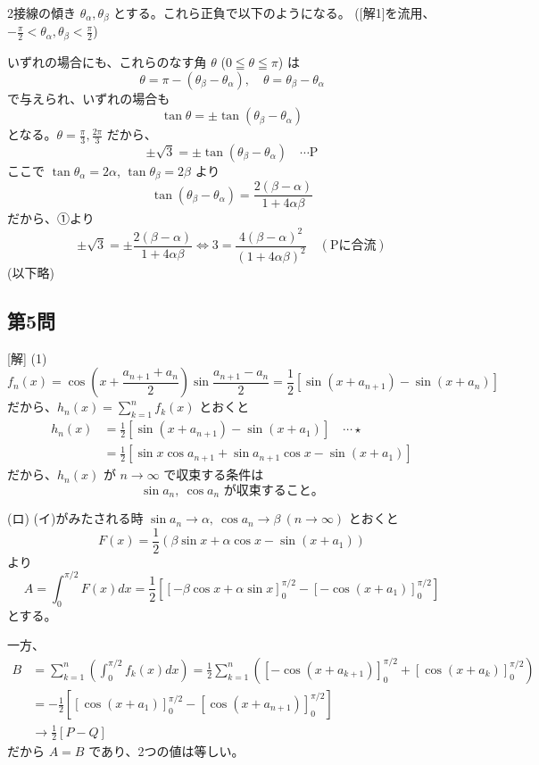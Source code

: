 \documentclass[../main.tex]{subfiles}
\begin{document}
\medskip
[解2] 2接線の傾き $\theta_\alpha, \theta_\beta$ とする。これら正負で以下のようになる。
([解1]を流用、$ -\frac{\pi}{2} < \theta_\alpha, \theta_\beta < \frac{\pi}{2} $)

いずれの場合にも、これらのなす角 $\theta$ ($0 \leqq \theta \leqq \pi$) は
\[
  \theta = \pi - (\theta_\beta - \theta_\alpha), \quad \theta = \theta_\beta - \theta_\alpha
\]
で与えられ、いずれの場合も
\[
  \tan\theta = \pm \tan(\theta_\beta - \theta_\alpha)
\]
となる。$\theta = \frac{\pi}{3}, \frac{2\pi}{3}$ だから、
\[
  \pm \sqrt{3} = \pm \tan(\theta_\beta - \theta_\alpha) \quad \cdots \text{P}
\]
ここで $\tan\theta_\alpha = 2\alpha$, $\tan\theta_\beta = 2\beta$ より
\[
  \tan(\theta_\beta - \theta_\alpha) = \frac{2(\beta-\alpha)}{1+4\alpha\beta}
\]
だから、①より
\[
  \pm \sqrt{3} = \pm \frac{2(\beta-\alpha)}{1+4\alpha\beta} \iff 3 = \frac{4(\beta-\alpha)^2}{(1+4\alpha\beta)^2} \quad (\text{Pに合流})
\]
(以下略)

\subsection*{第5問}

[解] (1)
\[
  f_n(x) = \cos\left(x + \frac{a_{n+1}+a_n}{2}\right) \sin\frac{a_{n+1}-a_n}{2} = \frac{1}{2} \left[ \sin(x+a_{n+1}) - \sin(x+a_n) \right]
\]
だから、$h_n(x) = \sum_{k=1}^n f_k(x)$ とおくと
\[
  \begin{aligned}
    h_n(x) &= \frac{1}{2} \left[ \sin(x+a_{n+1}) - \sin(x+a_1) \right] \quad \cdots \star \\
    &= \frac{1}{2} \left[ \sin x \cos a_{n+1} + \sin a_{n+1} \cos x - \sin(x+a_1) \right]
  \end{aligned}
\]
だから、$h_n(x)$ が $n \to \infty$ で収束する条件は
\[
  \sin a_n, \ \cos a_n \text{ が収束すること。}
\]

(ロ) (イ)がみたされる時 $\sin a_n \to \alpha, \ \cos a_n \to \beta \ (n \to \infty)$ とおくと
\[
  F(x) = \frac{1}{2} \left( \beta \sin x + \alpha \cos x - \sin(x+a_1) \right)
\]
より
\[
  A = \int_0^{\pi/2} F(x) dx = \frac{1}{2} \left[ \left[ -\beta \cos x + \alpha \sin x \right]_0^{\pi/2} - \left[ -\cos(x+a_1) \right]_0^{\pi/2} \right]
\]
とする。

一方、
\[
  \begin{aligned}
    B &= \sum_{k=1}^n \left( \int_0^{\pi/2} f_k(x) dx \right) = \frac{1}{2} \sum_{k=1}^n \left( \left[ -\cos(x+a_{k+1}) \right]_0^{\pi/2} + \left[ \cos(x+a_k) \right]_0^{\pi/2} \right) \\
    &= -\frac{1}{2} \left[ \left[ \cos(x+a_1) \right]_0^{\pi/2} - \left[ \cos(x+a_{n+1}) \right]_0^{\pi/2} \right] \\
    &\to \frac{1}{2} [ P - Q ]
  \end{aligned}
\]
だから $A = B$ であり、2つの値は等しい。
\end{document}
